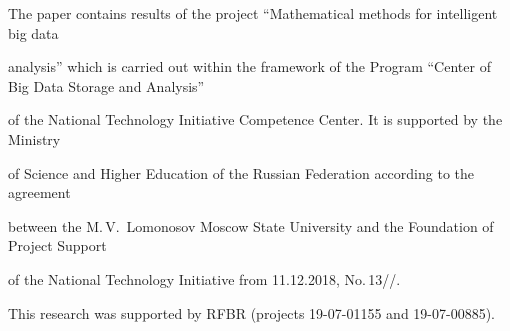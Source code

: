 





\Ack

\noindent

The paper contains results of the project ``Mathematical methods for intelligent big data 

analysis'' which is carried out within the framework of the Program ``Center of Big Data Storage and Analysis''

 of the National Technology Initiative Competence Center. It is supported by the Ministry 

 of Science and Higher Education of the Russian Federation according to the agreement 

 between the M.\,V.~Lomonosov Moscow State University and the Foundation of Project Support 

 of the National Technology Initiative from 11.12.2018, No.\,13\!/\!/. 

 This research was supported by RFBR (projects 19-07-01155 and 19-07-00885).






\renewcommand{\bibname}{\protect\rmfamily References}




